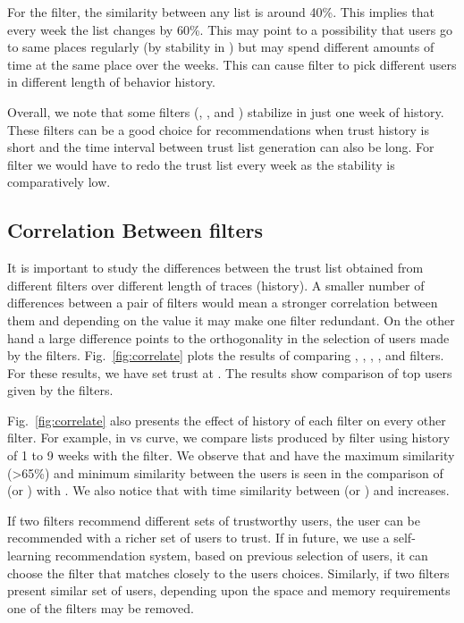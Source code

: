 \documentclass[10pt,conference]{IEEEtran}
\begin{document}
For the  filter, the similarity between any list is around 40\%. This implies that every week the list changes by 60\%. This may point to a possibility that users go to same places regularly (by stability in  ) but may spend different amounts of time at the same place over the weeks. This can cause  filter to pick different users in different length of behavior history.

Overall, we note that some filters (, , and ) stabilize in just one week of history. These filters can be a good choice for recommendations when trust history is short and the time interval between trust list generation can also be long. For  filter we would have to redo the trust list every week as the stability is comparatively low.




\subsection{Correlation Between filters}

It is important to study the differences between the trust list obtained from different filters over different length of traces (history). A smaller number of differences between a pair of filters would mean a stronger correlation between them and depending on the value it may make one filter redundant. On the other hand a large difference points to the orthogonality in the selection of users made by the filters. Fig.~\ref{fig:correlate} plots the results of comparing , , , ,  and  filters. For these results, we have set trust at . The results show comparison of top  users given by the filters. 

Fig.~\ref{fig:correlate} also presents the effect of history of each filter on every other filter. For example, in  vs  curve, we compare lists produced by  filter using history of 1 to 9 weeks with the  filter.  We observe that  and  have the maximum similarity (\textgreater 65\%) and minimum similarity between the users is seen in the comparison of  (or ) with .  We also notice that with time similarity between  (or ) and  increases.

If two filters recommend different sets of trustworthy users, the user can be recommended with a richer set of users to trust. If in future, we use a self-learning recommendation system, based on previous selection of users, it can choose the filter that matches closely to the users choices. Similarly, if two filters present similar set of users, depending upon the space and memory requirements one of the filters may be removed. 
\end{document}
